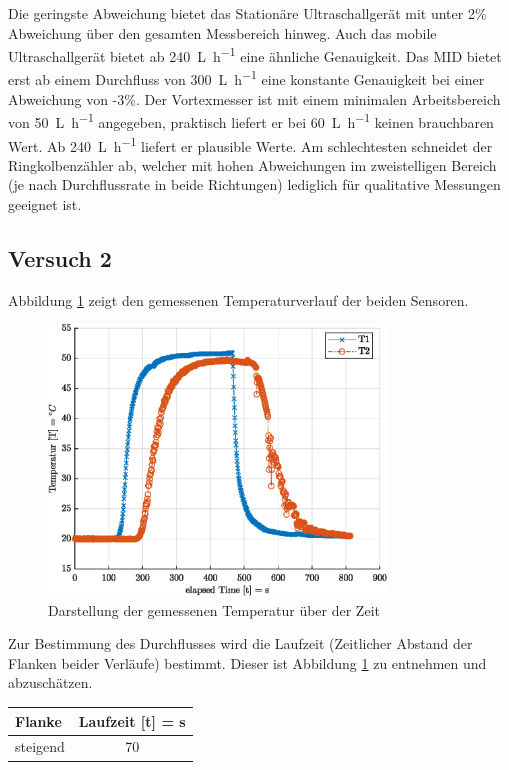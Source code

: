 Die geringste Abweichung bietet das Stationäre Ultraschallgerät mit unter 2\% Abweichung über den gesamten Messbereich hinweg. Auch das mobile Ultraschallgerät bietet ab \SI{240}{\liter\per\hour} eine ähnliche Genauigkeit. Das MID bietet erst ab einem Durchfluss von \SI{300}{\liter\per\hour} eine konstante Genauigkeit bei einer Abweichung von -3\%. Der Vortexmesser ist mit einem minimalen Arbeitsbereich von \SI{50}{\liter\per\hour} angegeben, praktisch liefert er bei \SI{60}{\liter\per\hour} keinen brauchbaren Wert. Ab \SI{240}{\liter\per\hour} liefert er plausible Werte. Am schlechtesten schneidet der Ringkolbenzähler ab, welcher mit hohen Abweichungen im zweistelligen Bereich (je nach Durchflussrate in beide Richtungen) lediglich für qualitative Messungen geeignet ist.

\subsection{Versuch 2}


Abbildung \ref{fig:temp} zeigt den gemessenen Temperaturverlauf der beiden Sensoren.

\begin{figure}[H]
	\centering
	\includegraphics[width=0.8\textwidth]{../DATA/tempPlot.eps}
	\caption{Darstellung der gemessenen Temperatur über der Zeit}
	\label{fig:temp}
\end{figure}

Zur Bestimmung des Durchflusses wird  die Laufzeit (Zeitlicher Abstand der Flanken beider Verläufe) bestimmt. Dieser ist Abbildung \ref{fig:temp} zu entnehmen und abzuschätzen.

\begin{center}
	\begin{tabular}{l|c}
		\label{tab:}
		
		\textbf{Flanke} & \textbf{Laufzeit} [t] = s\\
		\hline
		steigend & 70 
	\end{tabular}
\end{center}

